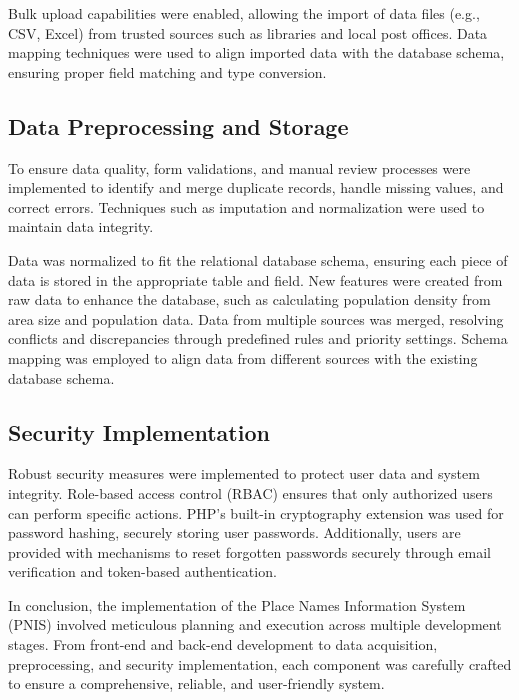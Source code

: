 Bulk upload capabilities were enabled, allowing the import of data files (e.g., CSV, Excel) from trusted sources such as libraries and local post offices. Data mapping techniques were used to align imported data with the database schema, ensuring proper field matching and type conversion.

\subsection{Data Preprocessing and Storage}
To ensure data quality, form validations, and manual review processes were implemented to identify and merge duplicate records, handle missing values, and correct errors. Techniques such as imputation and normalization were used to maintain data integrity.

Data was normalized to fit the relational database schema, ensuring each piece of data is stored in the appropriate table and field. New features were created from raw data to enhance the database, such as calculating population density from area size and population data. Data from multiple sources was merged, resolving conflicts and discrepancies through predefined rules and priority settings. Schema mapping was employed to align data from different sources with the existing database schema.

\subsection{Security Implementation}
Robust security measures were implemented to protect user data and system integrity. Role-based access control (RBAC) ensures that only authorized users can perform specific actions. PHP's built-in cryptography extension was used for password hashing, securely storing user passwords. Additionally, users are provided with mechanisms to reset forgotten passwords securely through email verification and token-based authentication.

In conclusion, the implementation of the Place Names Information System (PNIS) involved meticulous planning and execution across multiple development stages. From front-end and back-end development to data acquisition, preprocessing, and security implementation, each component was carefully crafted to ensure a comprehensive, reliable, and user-friendly system.